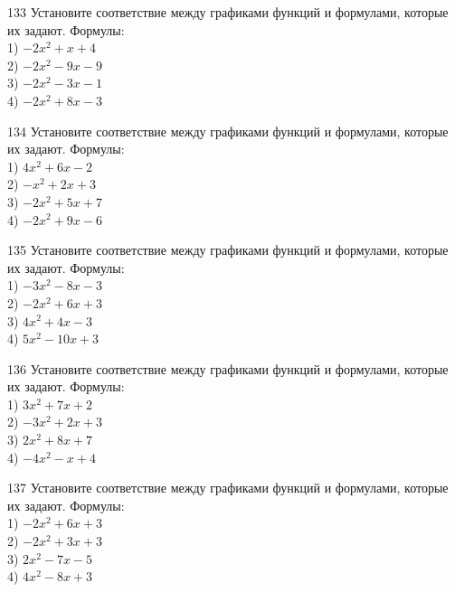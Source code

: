 \documentclass[4apaper]{article}
\begin{document}
\begin{taskBN}{133}
Установите соответствие между графиками функций и формулами, которые их задают. Формулы: \\1) $-2x^2+x+4$\\2) $-2x^2-9x-9$\\3) $-2x^2-3x-1$\\4) $-2x^2+8x-3$
\end{taskBN}

\begin{taskBN}{134}
Установите соответствие между графиками функций и формулами, которые их задают. Формулы: \\1) $4x^2+6x-2$\\2) $-x^2+2x+3$\\3) $-2x^2+5x+7$\\4) $-2x^2+9x-6$
\end{taskBN}

\begin{taskBN}{135}
Установите соответствие между графиками функций и формулами, которые их задают. Формулы: \\1) $-3x^2-8x-3$\\2) $-2x^2+6x+3$\\3) $4x^2+4x-3$\\4) $5x^2-10x+3$
\end{taskBN}

\begin{taskBN}{136}
Установите соответствие между графиками функций и формулами, которые их задают. Формулы: \\1) $3x^2+7x+2$\\2) $-3x^2+2x+3$\\3) $2x^2+8x+7$\\4) $-4x^2-x+4$
\end{taskBN}

\begin{taskBN}{137}
Установите соответствие между графиками функций и формулами, которые их задают. Формулы: \\1) $-2x^2+6x+3$\\2) $-2x^2+3x+3$\\3) $2x^2-7x-5$\\4) $4x^2-8x+3$
\end{taskBN}
\end{document}
